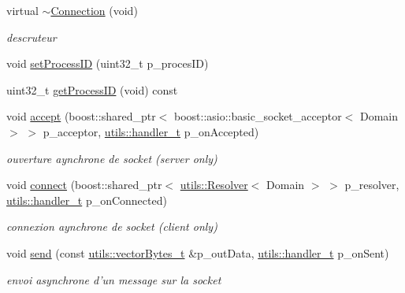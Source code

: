 \begin{DoxyCompactItemize}
\item 
virtual \hyperlink{classxtd_1_1network_1_1base_1_1Connection_a51f309c311421eb6a378354914816fac}{$\sim$\-Connection} (void)
\begin{DoxyCompactList}\small\item\em descruteur \end{DoxyCompactList}\item 
void \hyperlink{classxtd_1_1network_1_1base_1_1Connection_ad5e705dc3bc5dd4e020c8caf450aab80}{set\-Process\-I\-D} (uint32\-\_\-t p\-\_\-proces\-I\-D)
\item 
uint32\-\_\-t \hyperlink{classxtd_1_1network_1_1base_1_1Connection_a5cc120a87112e3923ffc01b341ace70b}{get\-Process\-I\-D} (void) const 
\item 
void \hyperlink{classxtd_1_1network_1_1base_1_1Connection_af8da803db4caa1f125548508cf3db134}{accept} (boost\-::shared\-\_\-ptr$<$ boost\-::asio\-::basic\-\_\-socket\-\_\-acceptor$<$ Domain $>$ $>$ p\-\_\-acceptor, \hyperlink{namespacextd_1_1network_1_1utils_ac8a6f796cd645f83cde023d163665bb5}{utils\-::handler\-\_\-t} p\-\_\-on\-Accepted)
\begin{DoxyCompactList}\small\item\em ouverture aynchrone de socket (server only) \end{DoxyCompactList}\item 
void \hyperlink{classxtd_1_1network_1_1base_1_1Connection_a408b83f0e43d18e32f31d6c13d6dcdf3}{connect} (boost\-::shared\-\_\-ptr$<$ \hyperlink{classxtd_1_1network_1_1utils_1_1Resolver}{utils\-::\-Resolver}$<$ Domain $>$ $>$ p\-\_\-resolver, \hyperlink{namespacextd_1_1network_1_1utils_ac8a6f796cd645f83cde023d163665bb5}{utils\-::handler\-\_\-t} p\-\_\-on\-Connected)
\begin{DoxyCompactList}\small\item\em connexion aynchrone de socket (client only) \end{DoxyCompactList}\item 
void \hyperlink{classxtd_1_1network_1_1base_1_1Connection_a8ebc5958cf7d27a902bd75a55c4648bf}{send} (const \hyperlink{namespacextd_1_1network_1_1utils_a9fedf0d18549b8034e9ae347955e9a9a}{utils\-::vector\-Bytes\-\_\-t} \&p\-\_\-out\-Data, \hyperlink{namespacextd_1_1network_1_1utils_ac8a6f796cd645f83cde023d163665bb5}{utils\-::handler\-\_\-t} p\-\_\-on\-Sent)
\begin{DoxyCompactList}\small\item\em envoi asynchrone d'un message sur la socket \end{DoxyCompactList}\item 

\end{DoxyCompactItemize}
